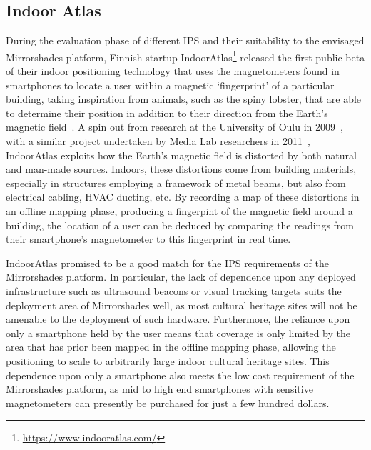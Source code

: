 
\subsection{Indoor Atlas}

During the evaluation phase of different IPS and their suitability to the envisaged Mirrorshades platform, Finnish startup IndoorAtlas\footnote{\url{https://www.indooratlas.com/}} released the first public beta of their indoor positioning technology that uses the magnetometers found in smartphones to locate a user within a magnetic `fingerprint' of a particular building, taking inspiration from animals, such as the spiny lobster, that are able to determine their position in addition to their direction from the Earth's magnetic field~\cite{Boles2003}. A spin out from research at the University of Oulu in 2009~\cite{Haverinen2009,Haverinen2009a}, with a similar project undertaken by Media Lab researchers in 2011~\cite{Chung2011}, IndoorAtlas exploits how the Earth's magnetic field is distorted by both natural and man-made sources. Indoors, these distortions come from building materials, especially in structures employing a framework of metal beams, but also from electrical cabling, HVAC ducting, etc. By recording a map of these distortions in an offline mapping phase, producing a fingerpint of the magnetic field around a building, the location of a user can be deduced by comparing the readings from their smartphone's magnetometer to this fingerprint in real time.

IndoorAtlas promised to be a good match for the IPS requirements of the Mirrorshades platform. In particular, the lack of dependence upon any deployed infrastructure such as ultrasound beacons or visual tracking targets suits the deployment area of Mirrorshades well, as most cultural heritage sites will not be amenable to the deployment of such hardware. Furthermore, the reliance upon only a smartphone held by the user means that coverage is only limited by the area that has prior been mapped in the offline mapping phase, allowing the positioning to scale to arbitrarily large indoor cultural heritage sites. This dependence upon only a smartphone also meets the low cost requirement of the Mirrorshades platform, as mid to high end smartphones with sensitive magnetometers can presently be purchased for just a few hundred dollars.

